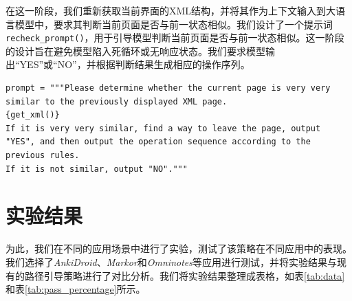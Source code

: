 \documentclass[UTF8, fontset=windows]{article}
\begin{document}
在这一阶段，我们重新获取当前界面的XML结构，并将其作为上下文输入到大语言模型中，要求其判断当前页面是否与前一状态相似。我们设计了一个提示词 \texttt{recheck\_prompt()}，用于引导模型判断当前页面是否与前一状态相似。这一阶段的设计旨在避免模型陷入死循环或无响应状态。我们要求模型输出“YES”或“NO”，并根据判断结果生成相应的操作序列。

\begin{lstlisting}
prompt = """Please determine whether the current page is very very similar to the previously displayed XML page.
{get_xml()}
If it is very very similar, find a way to leave the page, output "YES", and then output the operation sequence according to the previous rules.
If it is not similar, output "NO"."""
\end{lstlisting}

\section{实验结果}

为此，我们在不同的应用场景中进行了实验，测试了该策略在不同应用中的表现。我们选择了\textit{AnkiDroid}、\textit{Markor}和\textit{Omninotes}等应用进行测试，并将实验结果与现有的路径引导策略进行了对比分析。我们将实验结果整理成表格，如表\ref{tab:data}和表\ref{tab:pass_percentage}所示。
\end{document}
